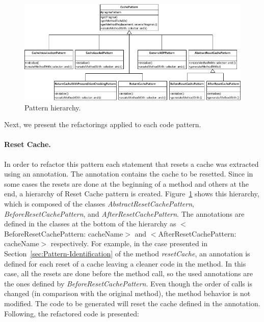 \documentclass[preprint,10pt]{sigplanconf}
\newcommand{\secref}[1]{Section~\ref{sec:#1}\xspace}
\newcommand{\figlabel}[1]{\label{fig:#1}}
\newcommand{\figref}[1]{Figure~\ref{fig:#1}\xspace}
\begin{document}
%
\begin{figure}
\begin{centering}
\includegraphics[bb=21bp 541bp 561bp 789bp,scale=0.7]{PatternInheritance}
\par\end{centering}

\caption{Pattern hierarchy.\figlabel{Pattern-hierarchy}}

\end{figure}


Next, we present the refactorings applied to each code pattern.

\paragraph{Reset Cache.} In order to refactor this pattern each statement
that resets a cache was extracted using an annotation. The annotation contains
the cache to be resetted. Since in some cases the resets are done
at the beginning of a method and others at the end, a hierarchy of
Reset Cache pattern is created. \figref{Pattern-hierarchy} shows this hierarchy, which is composed of the classes \emph{AbstractResetCachePattern},
\emph{BeforeResetCachePattern}, and \emph{AfterResetCachePattern}.
The annotations are defined in the classes at the bottom of the hierarchy
as $<$BeforeResetCachePattern: cacheName$>$ and $<$AfterResetCachePattern:
cacheName$>$ respectively. For example, in the case presented in 
\secref{Pattern-Identification} of the method \emph{resetCache},
an annotation is defined for each reset of a cache leaving a cleaner code
in the method. In this case, all the resets are done before the method
call, so the used annotations are the ones defined by \emph{BeforeResetCachePattern}.
Even though the order of calls is changed (in comparison with the
original method), the method behavior is not modified. The code to
be generated will reset the cache defined
in the annotation. Following, the refactored code is presented:
\end{document}
